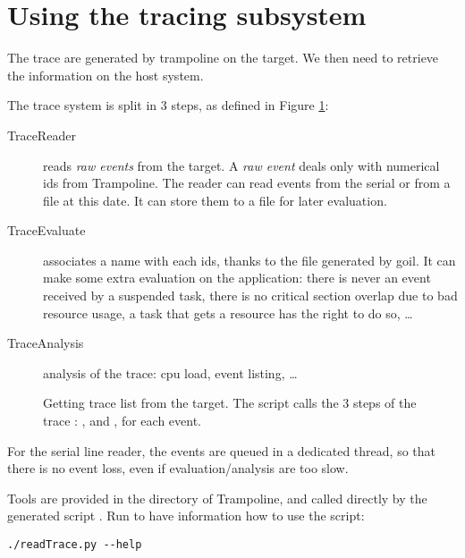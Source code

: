 \section{Using the tracing subsystem}

The trace are generated by trampoline on the target. We then need to retrieve the information on the host system. 

The trace system is split in 3 steps, as defined in Figure \ref{fig:trace}:
\begin{description}
	\item[TraceReader] reads \textsl{raw events} from the target. A \textsl{raw event} deals only with numerical ids from Trampoline. The reader can read events from the serial or from a file at this date. It can store them to a file for later evaluation.
	\item[TraceEvaluate] associates a name with each ids, thanks to the  file generated by goil. It can make some extra evaluation on the application: there is never an event received by a suspended task, there is no critical section overlap due to bad resource usage, a task that gets a resource has the right to do so, …
	\item[TraceAnalysis] analysis of the trace: cpu load, event listing, …
\end{description}

\begin{figure}[htbp]
    \centering
	\begin{adjustbox}{width=.7\linewidth,keepaspectratio}
		
	\end{adjustbox}
\caption{Getting trace list from the target. The  script calls the 3 steps of the trace : ,  and , for each event.}
	\label{fig:trace}
\end{figure}

For the serial line reader, the events are queued in a dedicated thread, so that there is no event loss, even if evaluation/analysis are too slow.


Tools are provided in the  directory of Trampoline, and called directly by the generated script . Run to have information how to use the script:

\begin{lstlisting}
./readTrace.py --help
\end{lstlisting}

